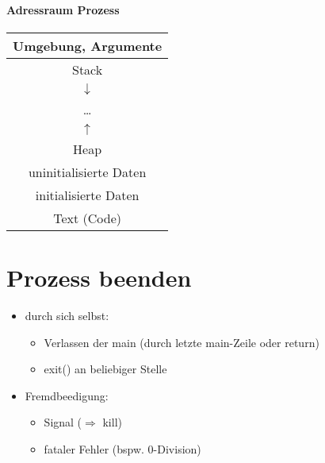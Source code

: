 \documentclass{scrreprt}
\renewcommand{\imptnt}[1]{#1}
\begin{document}
\paragraph{Adressraum Prozess} \parskp
\begin{tabular}{| c |}
\hline 
Umgebung, Argumente\\
\hline 
Stack\\
$\downarrow$\\
…\\
$\uparrow$\\
Heap\\
\hline
uninitialisierte Daten\\
\hline
initialisierte Daten\\
\hline
Text (Code)\\
\hline
\end{tabular}
\section{Prozess beenden}
\begin{itemize}
\item \imptnt{durch sich selbst}:
\begin{itemize}
\item Verlassen der main (durch letzte main-Zeile oder return)
\item exit() an beliebiger Stelle
\end{itemize}
\item Fremdbeedigung:
\begin{itemize}
\item Signal ($\Rightarrow$ kill)
\item fataler Fehler (bspw. 0-Division)
\end{itemize}
\end{itemize}
\end{document}
